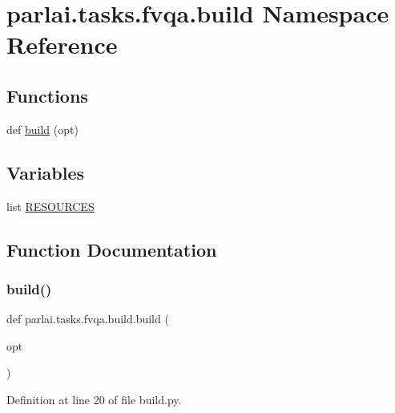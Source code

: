 \hypertarget{namespaceparlai_1_1tasks_1_1fvqa_1_1build}{}\section{parlai.\+tasks.\+fvqa.\+build Namespace Reference}
\label{namespaceparlai_1_1tasks_1_1fvqa_1_1build}
\subsection*{Functions}
\begin{DoxyCompactItemize}
\item 
def \hyperlink{namespaceparlai_1_1tasks_1_1fvqa_1_1build_a3a2e24cb615d980f27a566616af6292c}{build} (opt)
\end{DoxyCompactItemize}
\subsection*{Variables}
\begin{DoxyCompactItemize}
\item 
list \hyperlink{namespaceparlai_1_1tasks_1_1fvqa_1_1build_a3e436caffe57471e54ae132803852fe7}{R\+E\+S\+O\+U\+R\+C\+ES}
\end{DoxyCompactItemize}


\subsection{Function Documentation}
\mbox{\label{namespaceparlai_1_1tasks_1_1fvqa_1_1build_a3a2e24cb615d980f27a566616af6292c}} 
\subsubsection{\texorpdfstring{build()}{build()}}
{\footnotesize\ttfamily def parlai.\+tasks.\+fvqa.\+build.\+build (\begin{DoxyParamCaption}\item[{}]{opt }\end{DoxyParamCaption})}



Definition at line 20 of file build.\+py.


